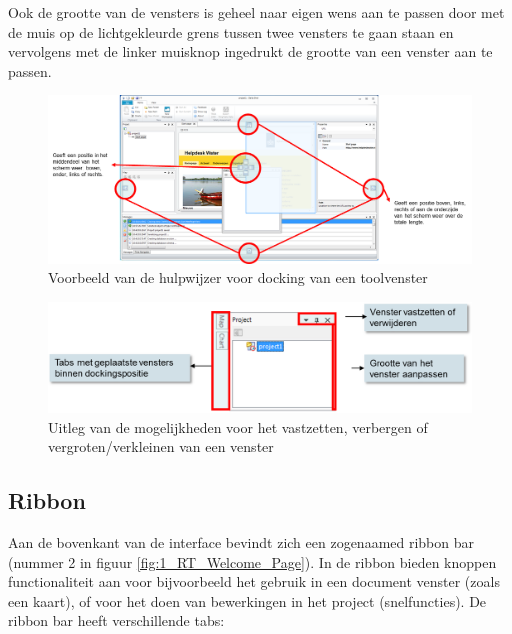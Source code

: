 Ook de grootte van de vensters is geheel naar eigen wens aan te passen door met de muis op de lichtgekleurde grens tussen twee vensters te gaan staan en vervolgens met de linker muisknop ingedrukt de grootte van een venster aan te passen.

\begin{figure}[H]
	\centering
		\includegraphics[width=\textwidth]{figures/chapter_general/rt_Docking_explained.png}
		\caption{Voorbeeld van de hulpwijzer voor docking van een toolvenster}
	\label{fig:3_Docking}
\end{figure}

\begin{figure}[H]
	\centering
		\includegraphics[width=\textwidth]{figures/chapter_general/rt_Pin_UnPin_Explained.png}
		\caption{Uitleg van de mogelijkheden voor het vastzetten, verbergen of vergroten/verkleinen van een venster}
	\label{fig:3_Pin_UnPin}
\end{figure}

\subsection{Ribbon}
	\label{sec:RT_Toolbar}
Aan de bovenkant van de interface bevindt zich een zogenaamed ribbon bar (nummer 2 in figuur \ref{fig:1_RT_Welcome_Page}). In de ribbon bieden knoppen functionaliteit aan voor bijvoorbeeld het gebruik in een document venster (zoals een kaart), of voor het doen van bewerkingen in het project (snelfuncties). De ribbon bar heeft verschillende tabs:

